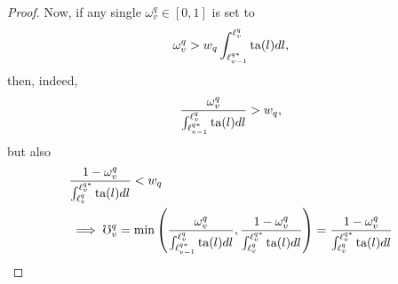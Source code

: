 \documentclass[hidelinks, nonatbib]{elsarticle}
\begin{document}
\begin{lemma}
\begin{proof}
        Now, if any single $\omega_{v}^{q} \in [0,1]$ is set to
        \begin{gather}
            \omega_{v}^{q} > 
            w_q
            \int_{
                \ell_{v-1}^{q*}
            }^{
                \ell_{v}^{q}
            }{
                \text{ta}(l)
                dl
            }
            ,
        \end{gather}
        then, indeed,
        \begin{gather}
            \frac{
                \omega_{v}^{q}
            }{
                \int_{
                    \ell_{v-1}^{q*}
                }^{
                    \ell_{v}^{q}
                }{
                    \text{ta}(l)dl
                }
            }
            >
            w_q
            ,
        \end{gather}
        but also
        \begin{align}
            &
            \frac{
                1 - \omega_{v}^{q}
            }{
                \int_{
                    \ell_{v}^{q}
                }^{
                    \ell_{v}^{q*}
                }{
                    \text{ta}(l)dl
                }
            }
            <
            w_q
            \\
            &\implies
            \mho_{v}^{q} = 
            \min\left(
                \frac{
                    \omega_{v}^{q}
                }{
                    \int_{
                        \ell_{v-1}^{q*}
                    }^{
                        \ell_{v}^{q}
                    }
                    \text{ta}(l)dl
                }
                ,
                \frac{
                    1-\omega_{v}^{q}
                }{
                    \int_{
                        \ell_{v}^{q}
                    }^{
                        \ell_{v}^{q*}
                    }
                    \text{ta}(l)dl
                }
            \right)
            =
            \frac{
                1 - \omega_{v}^{q}
            }{
                \int_{
                    \ell_{v}^{q}
                }^{
                    \ell_{v}^{q*}
                }{
                    \text{ta}(l)dl
}}
\end{align}
\end{proof}
\end{lemma}
\end{document}
